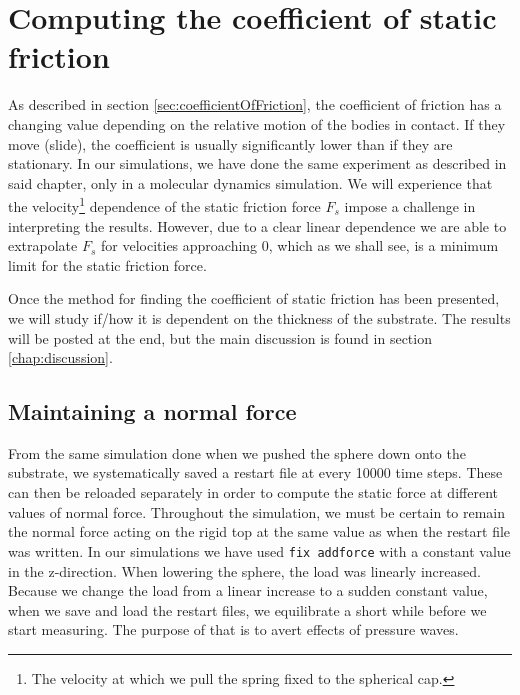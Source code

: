 \documentclass[twoside,english]{uiofysmaster}
\begin{document}
\chapter{Computing the coefficient of static friction} \label{chp:coefficientOfFriction}
As described in section \ref{sec:coefficientOfFriction}, the coefficient of friction has a changing value depending on the relative motion of the bodies in contact. 
If they move (slide), the coefficient is usually significantly lower than if they are stationary. 
In our simulations, we have done the same experiment as described in said chapter, only in a molecular dynamics simulation. 
We will experience that the velocity\footnote{The velocity at which we pull the spring fixed to the spherical cap.} dependence of the static friction force $F_s$ impose a challenge in interpreting the results.
However, due to a clear linear dependence we are able to extrapolate $F_s$ for velocities approaching 0, which as we shall see, is a minimum limit for the static friction force. 

Once the method for finding the coefficient of static friction has been presented, we will study if/how it is dependent on the thickness of the substrate.
The results will be posted at the end, but the main discussion is found in section \ref{chap:discussion}.

\section{Maintaining a normal force}
From the same simulation done when we pushed the sphere down onto the substrate, we systematically saved a restart file at every 10000 time steps.
These can then be reloaded separately in order to compute the static force at different values of normal force.
Throughout the simulation, we must be certain to remain the normal force acting on the rigid top at the same value as when the restart file was written.
In our simulations we have used \texttt{fix addforce} with a constant value in the z-direction.
When lowering the sphere, the load was linearly increased. 
Because we change the load from a linear increase to a sudden constant value, when we save and load the restart files, we equilibrate a short while before we start measuring. 
The purpose of that is to avert effects of pressure waves.
\end{document}

